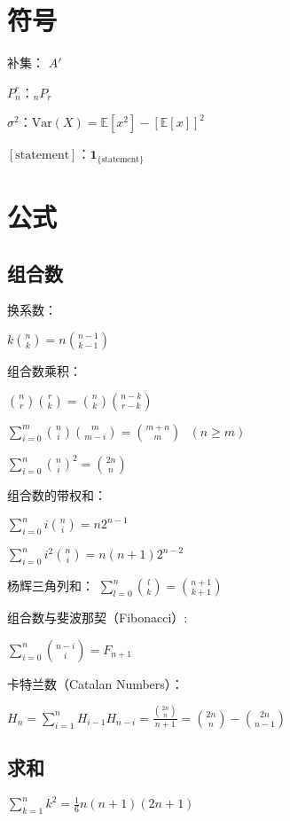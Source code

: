 \documentclass[9pt,landscape]{article}
\begin{document}
\begin{multicols}{3}

\columnseprule=0.25pt

\section{符号}

补集： $A'$

$P_n^r$：$_nP_r$

$\sigma^2$：$\text{Var}(X)=\mathbb{E}[x^2]-\left[\mathbb{E}[x]\right]^2$

$[\mathrm{statement}]$：$\mathbf{1}_{\{\mathrm{statement}\}}$

\section{公式}

\subsection{组合数}

换系数：

$k \binom{n}{k} = n \binom{n-1}{k-1}$

组合数乘积：

$\binom{n}{r}\binom{r}{k} = \binom{n}{k}\binom{n-k}{r-k}$

$\sum_{i=0}^m \binom{n}{i}\binom{m}{m-i} = \binom{m+n}{m}\ \ \ (n \geq m)$

$\sum_{i=0}^n\binom{n}{i}^2=\binom{2n}{n}$

组合数的带权和：

$ \sum_{i=0}^ni\binom{n}{i}=n2^{n-1}$

$ \sum_{i=0}^ni^2\binom{n}{i}=n(n+1)2^{n-2}$

杨辉三角列和：
$ \sum_{l=0}^n\binom{l}{k} = \binom{n+1}{k+1}$

组合数与斐波那契（Fibonacci）:

$ \sum_{i=0}^n\binom{n-i}{i}=F_{n+1}$

卡特兰数（Catalan Numbers）：

$H_n=\sum_{i=1}^nH_{i-1}H_{n-i}=\frac{\binom{2n}{n}}{n+1}=\binom{2n}{n}-\binom{2n}{n-1}$

\subsection{求和}

$\sum_{k=1}^{n}k^2=\frac{1}{6}n(n+1)(2n+1)$


\end{multicols}
\end{document}

